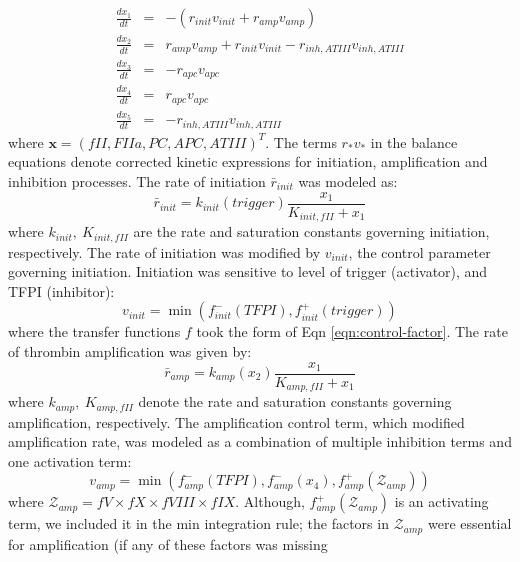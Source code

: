 \documentclass[12pt]{article}
\begin{document}
\begin{eqnarray}
	\frac{dx_{1}}{dt} & =& -\left(r_{init}v_{init} + r_{amp}v_{amp}\right)\\
	\frac{dx_{2}}{dt} &=& r_{amp}v_{amp} + r_{init}v_{init} - r_{inh,ATIII}v_{inh,ATIII}\\
	\frac{dx_{3}}{dt} &=& -r_{apc}v_{apc} \\
	\frac{dx_{4}}{dt} &=& r_{apc}v_{apc} \\
	\frac{dx_{5}}{dt} & = & -r_{inh,ATIII}v_{inh,ATIII}
\end{eqnarray}where $\mathbf{x} = \left(fII,FIIa,PC,APC,ATIII\right)^{T}$. 
The terms $r_{*}v_{*}$ in the balance equations denote corrected kinetic expressions for initiation, amplification and inhibition processes. 
The rate of initiation $\bar{r}_{init}$ was modeled as:
\begin{equation}
	\bar{r}_{init} = k_{init}\left(trigger\right)\frac{x_{1}}{K_{init,fII} + x_{1}}
\end{equation}where $k_{init},~K_{init,fII}$ are the rate and saturation constants governing initiation, respectively. 
The rate of initiation was modified by $v_{init}$, the control parameter governing initiation. 
Initiation was sensitive to level of trigger (activator), and TFPI (inhibitor):
\begin{equation}
	v_{init} = \min\left(f^{-}_{init}\left(TFPI\right),f^{+}_{init}\left(trigger\right)\right)
\end{equation}where the transfer functions $f$ took the form of Eqn \eqref{eqn:control-factor}.
The rate of thrombin amplification was given by:
\begin{equation}
	\bar{r}_{amp} = k_{amp}\left(x_{2}\right)\frac{x_{1}}{K_{amp,fII}+x_{1}}
\end{equation}where $k_{amp},~K_{amp,fII}$ denote the rate and saturation constants governing amplification, respectively. 
The amplification control term, which modified amplification rate, was modeled as a combination of multiple inhibition terms and one activation term:
\begin{equation}
	v_{amp} = \min\left(f^{-}_{amp}\left(TFPI\right),f^{-}_{amp}\left(x_{4}\right),f^{+}_{amp}\left(\mathcal{Z}_{amp}\right)\right)
\end{equation}where $\mathcal{Z}_{amp} = fV\times fX\times fVIII\times fIX$. Although, $f^{+}_{amp}\left(\mathcal{Z}_{amp}\right)$ is an activating term, 
we included it in the min integration rule; the factors in $\mathcal{Z}_{amp}$ were essential for amplification (if any of these factors was missing
\end{document}
